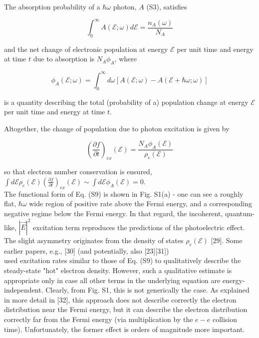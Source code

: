 \documentclass[10pt]{article}
\begin{document}
The absorption probability of a $\hbar \omega$ photon, $A$ (S3), satisfies


\begin{equation*}
\int_{0}^{\infty} A(\mathcal{E} ; \omega) d \mathcal{E}=\frac{n_{A}(\omega)}{N_{A}} \tag{S7}
\end{equation*}


and the net change of electronic population at energy $\mathcal{E}$ per unit time and energy at time $t$ due to absorption is $N_{A} \phi_{A}$, where


\begin{equation*}
\phi_{A}(\mathcal{E} ; \omega)=\int_{0}^{\infty} d \omega[A(\mathcal{E} ; \omega)-A(\mathcal{E}+\hbar \omega ; \omega)] \tag{S8}
\end{equation*}


is a quantity describing the total (probability of a) population change at energy $\mathcal{E}$ per unit time and energy at time $t$.

Altogether, the change of population due to photon excitation is given by


\begin{equation*}
\left(\frac{\partial f}{\partial t}\right)_{e x}(\mathcal{E})=\frac{N_{A} \phi_{A}(\mathcal{E})}{\rho_{e}(\mathcal{E})} \tag{S9}
\end{equation*}


so that electron number conservation is ensured, $\int d \mathcal{E} \rho_{e}(\mathcal{E})\left(\frac{\partial f}{\partial t}\right)_{e x}(\mathcal{E}) \sim \int d \mathcal{E} \phi_{A}(\mathcal{E})=0$.\\
The functional form of Eq. (S9) is shown in Fig. S1(a) - one can see a roughly flat, $\hbar \omega$ wide region of positive rate above the Fermi energy, and a corresponding negative regime below the Fermi energy. In that regard, the incoherent, quantum-like, $|\vec{E}|^{2}$ excitation term reproduces the predictions of the photoelectric effect. The slight asymmetry originates from the density of states $\rho_{e}(\mathcal{E})$ [29]. Some earlier papers, e.g., [30] (and potentially, also [23][31])\\[0pt]
used excitation rates similar to those of Eq. (S9) to qualitatively describe the steady-state "hot" electron density. However, such a qualitative estimate is appropriate only in case all other terms in the underlying equation are energy-independent. Clearly, from Fig. S1, this is not generically the case. As explained in more detail in [32], this approach does not describe correctly the electron distribution near the Fermi energy, but it can describe the electron distribution correctly far from the Fermi energy (via multiplication by the $e-e$ collision time). Unfortunately, the former effect is orders of magnitude more important.
\end{document}
